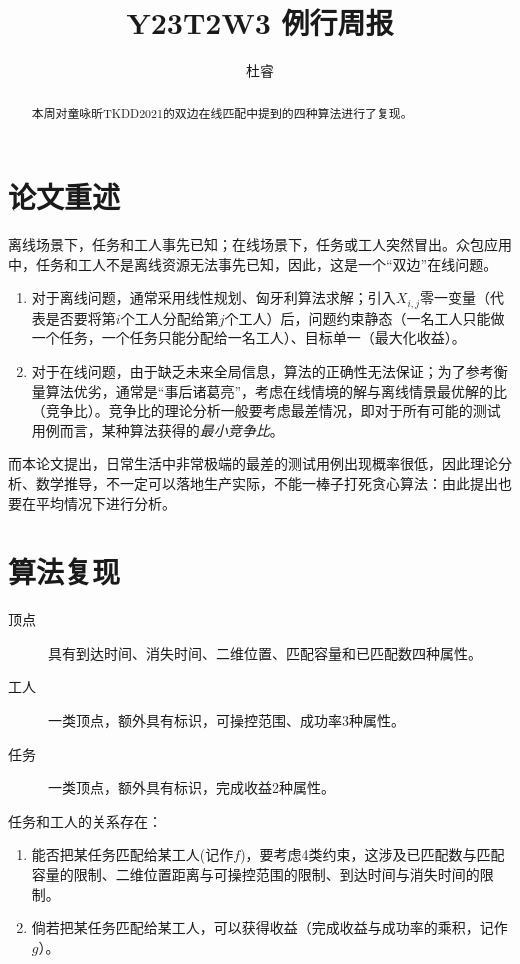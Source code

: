 \documentclass[a4paper,12pt]{ctexart}
\title{Y23T2W3 例行周报}
\author{杜睿}
\begin{document}
\tableofcontents
\maketitle

\begin{abstract}
    本周对童咏昕TKDD2021的双边在线匹配\cite{8897719}中提到的四种算法进行了复现。
\end{abstract}

\section{论文重述}

离线场景下，任务和工人事先已知；在线场景下，任务或工人突然冒出。众包应用中，任务和工人不是离线资源无法事先已知，因此，这是一个“双边”在线问题。

\begin{enumerate}
    \item 对于离线问题，通常采用线性规划、匈牙利算法求解；引入$X_{i, j}$零一变量（代表是否要将第$i$个工人分配给第$j$个工人）后，问题约束静态（一名工人只能做一个任务，一个任务只能分配给一名工人）、目标单一（最大化收益）。
    \item 对于在线问题，由于缺乏未来全局信息，算法的正确性无法保证；为了参考衡量算法优劣，通常是“事后诸葛亮”，考虑在线情境的解与离线情景最优解的比（竞争比）。竞争比的理论分析一般要考虑最差情况，即对于所有可能的测试用例而言，某种算法获得的\emph{最小竞争比}。
\end{enumerate}

而本论文提出，日常生活中非常极端的最差的测试用例出现概率很低，因此理论分析、数学推导，不一定可以落地生产实际，不能一棒子打死贪心算法：由此提出也要在平均情况下进行分析。

\section{算法复现}

\begin{description}
    \item [顶点] 具有到达时间、消失时间、二维位置、匹配容量和已匹配数四种属性。
    \item [工人] 一类顶点，额外具有标识，可操控范围、成功率3种属性。
    \item [任务] 一类顶点，额外具有标识，完成收益2种属性。
\end{description}

任务和工人的关系存在：
\begin{enumerate}
    \item 能否把某任务匹配给某工人(记作$f$)，要考虑4类约束，这涉及已匹配数与匹配容量的限制、二维位置距离与可操控范围的限制、到达时间与消失时间的限制。
    \item 倘若把某任务匹配给某工人，可以获得收益（完成收益与成功率的乘积，记作$g$）。
\end{enumerate}
\end{document}
